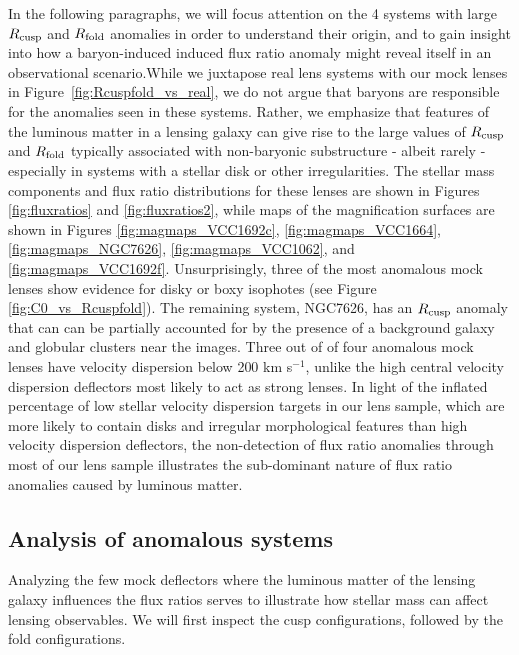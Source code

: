 In the following paragraphs, we will focus attention on the 4 systems with large $R_{\rm{cusp}}$ and $R_{\rm{fold}}$ anomalies in order to understand their origin, and to gain insight into how a baryon-induced induced flux ratio anomaly might reveal itself in an observational scenario.While we juxtapose real lens systems with our mock lenses in Figure~\ref{fig:Rcuspfold_vs_real}, we do not argue that baryons are responsible for the anomalies seen in these systems. Rather, we emphasize that features of the luminous matter in a lensing galaxy can give rise to the large values of $R_{\rm{cusp}}$ and $R_{\rm{fold}}$ typically associated with non-baryonic substructure - albeit rarely - especially in systems with a stellar disk or other irregularities. The stellar mass components and flux ratio distributions for these lenses are shown in Figures \ref{fig:fluxratios} and \ref{fig:fluxratios2}, while maps of the magnification surfaces are shown in Figures \ref{fig:magmaps_VCC1692c}, \ref{fig:magmaps_VCC1664}, \ref{fig:magmaps_NGC7626}, \ref{fig:magmaps_VCC1062}, and \ref{fig:magmaps_VCC1692f}.
Unsurprisingly, three of the most anomalous mock lenses show evidence for disky or boxy isophotes (see Figure \ref{fig:C0_vs_Rcuspfold}). The remaining system, NGC7626, has an $R_{\rm{cusp}}$ anomaly that can can be partially accounted for by the presence of a background galaxy and globular clusters near the images. Three out of of four anomalous mock lenses have velocity dispersion below 200 km s$^{-1}$, unlike the high central velocity dispersion deflectors most likely to act as strong lenses. In light of the inflated percentage of low stellar velocity dispersion targets in our lens sample, which are more likely to contain disks and irregular morphological features than high velocity dispersion deflectors, the non-detection of flux ratio anomalies through most of our lens sample illustrates the sub-dominant nature of flux ratio anomalies caused by luminous matter. 
\subsection{Analysis of anomalous systems}
Analyzing the few mock deflectors where the luminous matter of the lensing galaxy influences the flux ratios serves to illustrate how stellar mass can affect lensing observables. We will first inspect the cusp configurations, followed by the fold configurations.
